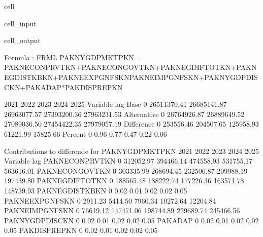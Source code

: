 \documentclass[letterpaper,10pt,english]{jupyterBook}
\begin{document}
\begin{sphinxuseclass}{cell}\begin{sphinxVerbatimInput}

\begin{sphinxuseclass}{cell_input}
\begin{sphinxVerbatim}[commandchars=\\\{\}]
 
    \PYG{p}{[}\PYG{p}{]}  
\end{sphinxVerbatim}

\end{sphinxuseclass}\end{sphinxVerbatimInput}
\begin{sphinxVerbatimOutput}

\begin{sphinxuseclass}{cell_output}
\begin{sphinxVerbatim}[commandchars=\\\{\}]
Formula        : FRML  \PYGZlt{}\PYGZgt{} PAKNYGDPMKTPKN = PAKNECONPRVTKN+PAKNECONGOVTKN+PAKNEGDIFTOTKN+PAKNEGDISTKBKN+PAKNEEXPGNFSKN\PYGZhy{}PAKNEIMPGNFSKN+PAKNYGDPDISCKN+PAKADAP*PAKDISPREPKN \PYGZdl{} 

                       2021        2022        2023        2024        2025
Variable    lag                                                            
Base        0   26511370.41 26685141.87 26963077.57 27393200.36 27963231.53
Alternative 0   26764926.87 26889649.52 27089036.50 27454422.35 27979057.19
Difference  0     253556.46   204507.65   125958.93    61221.99    15825.66
Percent     0          0.96        0.77        0.47        0.22        0.06

 Contributions to differende for  PAKNYGDPMKTPKN
                         2021       2022       2023       2024       2025
Variable       lag                                                       
PAKNECONPRVTKN 0   \PYGZhy{}312052.97 \PYGZhy{}394466.14 \PYGZhy{}474558.93 \PYGZhy{}531755.17 \PYGZhy{}563616.01
PAKNECONGOVTKN 0    303335.99  268694.45  232506.87  209988.19  197439.80
PAKNEGDIFTOTKN 0    188565.48  188222.74  177226.36  163571.78  148739.93
PAKNEGDISTKBKN 0        \PYGZhy{}0.02      \PYGZhy{}0.01      \PYGZhy{}0.02      \PYGZhy{}0.02      \PYGZhy{}0.05
PAKNEEXPGNFSKN 0     \PYGZhy{}2911.23   \PYGZhy{}5414.50   \PYGZhy{}7960.34  \PYGZhy{}10272.64  \PYGZhy{}12204.84
PAKNEIMPGNFSKN 0     76619.12  147471.06  198744.89  229689.74  245466.56
PAKNYGDPDISCKN 0        \PYGZhy{}0.02      \PYGZhy{}0.01      \PYGZhy{}0.02      \PYGZhy{}0.02      \PYGZhy{}0.05
PAKADAP        0        \PYGZhy{}0.02      \PYGZhy{}0.01      \PYGZhy{}0.02      \PYGZhy{}0.02      \PYGZhy{}0.05
PAKDISPREPKN   0        \PYGZhy{}0.02      \PYGZhy{}0.01      \PYGZhy{}0.02      \PYGZhy{}0.02      \PYGZhy{}0.05


\end{sphinxVerbatim}
\end{sphinxuseclass}
\end{sphinxVerbatimOutput}
\end{sphinxuseclass}
\end{document}

